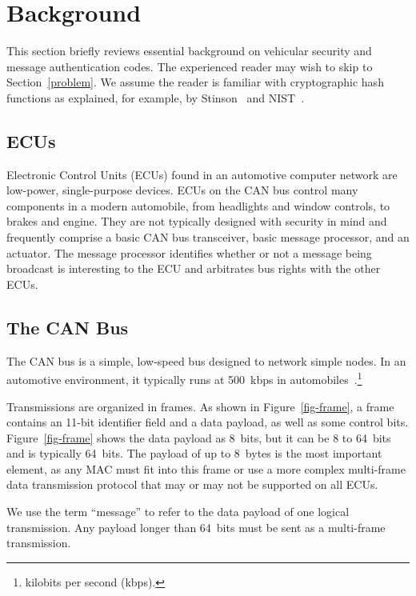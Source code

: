 \section{Background}
\label{background}

This section briefly reviews essential background on vehicular security and message authentication codes. 
The experienced reader may wish to skip to Section~\ref{problem}. 
We assume the reader is familiar with cryptographic hash functions as explained, for example, 
by Stinson~\cite{Stinson} and NIST~\cite{FIPS-180-4}.

\subsection{ECUs}
Electronic Control Units (ECUs) found in an automotive computer network are low-power, single-purpose devices. ECUs on the CAN bus control many components in a modern automobile, from headlights and window controls, to brakes and engine. They are not typically designed with security in mind and frequently comprise a basic CAN bus transceiver, basic message processor, and an actuator. The message processor identifies whether or not a message being broadcast is interesting to the ECU and arbitrates bus rights with the other ECUs. 

\subsection{The CAN Bus}
The CAN bus is a simple, low-speed bus designed to network simple nodes. In an automotive environment, 
it typically runs at 500~kbps in automobiles~\cite{canbus}.\footnote{kilobits per second (kbps).}

Transmissions are organized in frames.  As shown in Figure~\ref{fig-frame}, 
a frame contains an 11-bit identifier field and 
a data payload, as well as some control bits. Figure~\ref{fig-frame} shows the data payload as 8~bits, but
it can be 8 to 64~bits and is typically 64~bits.
The payload of up to 8~bytes is the most important element, 
as any MAC must fit into this frame or use a more complex multi-frame data transmission protocol 
that may or may not be supported on all ECUs. 


We use the term ``message'' to refer to the data payload of one logical transmission.
Any payload longer than 64~bits must be sent as a multi-frame transmission.


